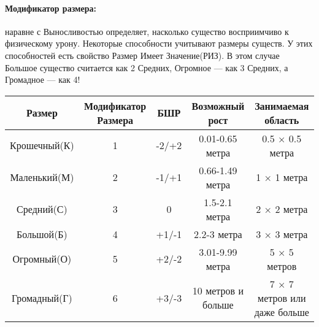 \paragraph{Модификатор размера:} наравне с Выносливостью определяет, насколько существо восприимчиво к физическому урону. Некоторые способности учитывают размеры существ. У этих способностей есть свойство Размер Имеет Значение(РИЗ). В этом случае Большое существо считается как 2 Средних, Огромное — как 3 Средних, а Громадное — как 4!
\begin{center}
\begin{tabular}{ |c|c|c|c|c| }
\hline
Размер & Модификатор Размера & БШР & Возможный рост & Занимаемая область
\\ \hline
Крошечный(К) & 1 & -2/+2 & 0.01-0.65 метра & 0.5 × 0.5 метра
\\ \hline
Маленький(М) & 2 & -1/+1 & 0.66-1.49 метра & 1 × 1 метра
\\ \hline
Средний(С) & 3 & 0 & 1.5-2.1 метра & 2 × 2 метра
\\ \hline
Большой(Б) & 4 & +1/-1 & 2.2-3 метра & 3 × 3 метра
\\ \hline
Огромный(О) & 5 & +2/-2 & 3.01-9.99 метра & 5 × 5 метров
\\ \hline
Громадный(Г) & 6 & +3/-3 & 10 метров и больше & 7 × 7 метров или даже больше
\\ \hline
\end{tabular}
\end{center}